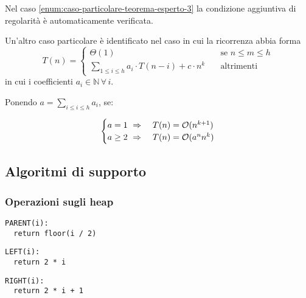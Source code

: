 \documentclass[italian, 10pt]{article}
\begin{document}
Nel caso \ref{enum:caso-particolare-teorema-esperto-3} la condizione aggiuntiva di regolarità è automaticamente verificata.

\bigskip
Un'altro caso particolare è identificato nel caso in cui la ricorrenza abbia forma
\[T(n) = \begin{cases}
    \Theta(1) \quad                                                           & \text{se } n \leq m \leq h \\
    \displaystyle \sum_{1 \leq i \leq h} a_i \cdot T(n-i) + c \cdot n^k \quad & \text{altrimenti}
  \end{cases}\]
in cui i coefficienti \(a_i \in \mathbb{N} \, \forall \, i\).

\bigskip
Ponendo \(a = \displaystyle \sum_{i \leq i \leq h} a_i\), se:

\[\begin{cases}
    a = 1  \ \Rightarrow \      & T(n) = \mathcal{O}(n^{k+1}) \\
    a \geq 2  \  \Rightarrow \  & T(n) = \mathcal{O}(a^n n^k)
  \end{cases}\]

\subsection{Algoritmi di supporto}

\subsubsection{Operazioni sugli heap}

\begin{center}
  \begin{minipage}{0.31\textwidth}
    \centering
    \begin{lstlisting}[style=pseudocode, numbers=none]
PARENT(i):
  return floor(i / 2)
\end{lstlisting}
  \end{minipage}
  \begin{minipage}{0.3\textwidth}
    \begin{lstlisting}[style=pseudocode, xleftmargin=20pt, xrightmargin=20pt, numbers=none]
LEFT(i):
  return 2 * i
\end{lstlisting}
  \end{minipage}
  \begin{minipage}{0.3\textwidth}
    \begin{lstlisting}[style=pseudocode, numbers=none]
RIGHT(i):
  return 2 * i + 1
\end{lstlisting}
  \end{minipage}
\end{center}
\end{document}
